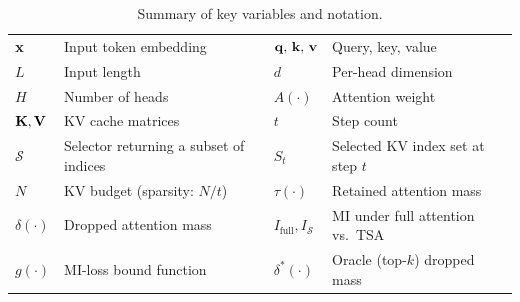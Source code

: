 \begin{table}[t]
\caption{Summary of key variables and notation.}
\label{tab:notation}
\centering
\renewcommand{\arraystretch}{1.15}
\begin{tabularx}{\columnwidth}{lX|lX}
\toprule
$\mathbf{x}$ & Input token embedding 
& $\mathbf{q},\,\mathbf{k},\,\mathbf{v}$ & Query, key, value \\
$L$ & Input length
& $d$ & Per-head dimension \\
$H$ & Number of heads
& $A(\cdot)$ & Attention weight \\
$\mathbf{K}, \mathbf{V}$ & KV cache matrices
& $t$ & Step count\\
$\mathcal S$ & Selector returning a subset of indices
& $S_t$ & Selected KV index set at step $t$ \\
$N$ & KV budget (sparsity: $N/t$)
& $\tau(\cdot)$ & Retained attention mass \\
$\delta(\cdot)$ & Dropped attention mass
& $I_{\mathrm{full}}, I_{\mathcal S}$ & MI under full attention vs.\ TSA \\
$g(\cdot)$ & MI-loss bound function
& $\delta^*(\cdot)$ & Oracle (top-$k$) dropped mass \\
\bottomrule
\end{tabularx}
\end{table}
